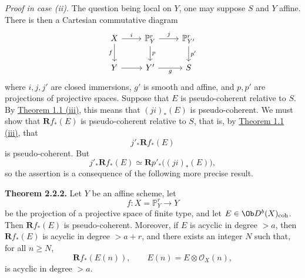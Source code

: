 \emph{Proof in case (ii).} The question being local on \(Y\), one may suppose \(S\) and \(Y\) affine. There is then a Cartesian commutative diagram
\[
\begin{tikzcd}
X \arrow[r,"i"] \arrow[d,"f"'] & \mathbb P^r_Y \arrow[d,"p"] \arrow[r,"j"] & \mathbb P^r_{Y'} \arrow[d,"p'"]\\
Y \arrow[r] & Y' \arrow[r,"g"'] & S
\end{tikzcd}
\]
where \(i,j,j'\) are closed immersions, \(g'\) is smooth and affine, and \(p,p'\) are projections of projective spaces. Suppose that \(E\) is pseudo-coherent relative to \(S\). By \hyperlink{sga6.e03.thm.1-1}{Theorem 1.1 (iii)}, this means that \((ji)_*(E)\) is pseudo-coherent. We must show that \(\mathbf Rf_*(E)\) is pseudo-coherent relative to \(S\), that is, by \hyperlink{sga6.e03.thm.1-1}{Theorem 1.1 (iii)}, that
\[
  j'_*\mathbf Rf_*(E)
\]
is pseudo-coherent. But
\[
  j'_*\mathbf Rf_*(E)\simeq \mathbf Rp'_*\bigl((ji)_*(E)\bigr),
\]
so the assertion is a consequence of the following more precise result.

\textbf{Theorem 2.2.2.} Let \(Y\) be an affine scheme, let
\[
  f:X=\mathbb P^r_Y\longrightarrow Y
\]
be the projection of a projective space of finite type, and let \(E\in \Ob D^b(X)_{\mathrm{coh}}\). Then \(\mathbf Rf_*(E)\) is pseudo-coherent. Moreover, if \(E\) is acyclic in degree \(>a\), then \(\mathbf Rf_*(E)\) is acyclic in degree \(>a+r\), and there exists an integer \(N\) such that, for all \(n\geq N\),
\[
  \mathbf Rf_*(E(n)),\qquad E(n)=E\otimes\mathcal O_X(n),
\]
is acyclic in degree \(>a\).

